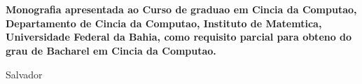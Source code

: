 

\begin{titlepage}
 \vfill
 \begin{center}
   {\large \uppercase{ \bf{ \meunome\ } } } \\[7cm]
   {\Huge \uppercase{ \bf{ \meutitulo\ } } }\\[1cm]
   \vfill
   \hspace{.45\textwidth} %
   \begin{minipage}{.5\textwidth}
     \begin{espacosimples}
       \bf{
	Monografia apresentada ao Curso de graduao em Cincia da Computao, 
	Departamento de Cincia da Computao, Instituto de Matemtica,  Universidade Federal da 
	Bahia, como requisito parcial para obteno do grau de Bacharel em  Cincia da Computao. \\ 
       }      
     \end{espacosimples}
     \begin{espacosimples}    
       \meuorientador
     \end{espacosimples}
   \end{minipage}
   \vfill
   Salvador \\
   \meuano
 \end{center}
\end{titlepage}
